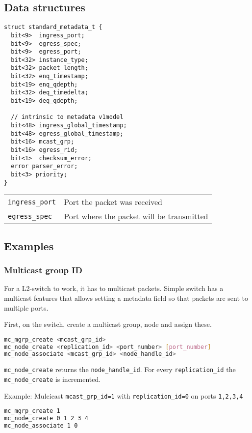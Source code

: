 \documentclass[a4paper, fontsize=8pt, landscape, DIV=1]{scrartcl}
\begin{document}
\begin{multicols*}{3}
  \subsection{Data structures}

  \begin{lstlisting}[style=P4style]
struct standard_metadata_t {
  bit<9>  ingress_port;
  bit<9>  egress_spec;
  bit<9>  egress_port;
  bit<32> instance_type;
  bit<32> packet_length;
  bit<32> enq_timestamp;
  bit<19> enq_qdepth;
  bit<32> deq_timedelta;
  bit<19> deq_qdepth;

  // intrinsic to metadata v1model
  bit<48> ingress_global_timestamp;
  bit<48> egress_global_timestamp;
  bit<16> mcast_grp;
  bit<16> egress_rid;
  bit<1>  checksum_error;
  error parser_error;
  bit<3> priority;
}\end{lstlisting}

\begin{tabularx}{\linewidth}{ l X }
  \lstinline[style=P4style]!ingress_port! &
  Port the packet was received \\
  \lstinline[style=P4style]!egress_spec! &
  Port where the packet will be transmitted \\
\end{tabularx}

  \subsection{Examples}

  \subsubsection{Multicast group ID}
  For a L2-switch to work, it has to multicast packets. Simple switch has a multicast features that
  allows setting a metadata field so that packets are sent to multiple ports.

  First, on the switch, create a multicast group, node and assign these.
  \begin{lstlisting}[language=bash]
mc_mgrp_create <mcast_grp_id>
mc_node_create <replication_id> <port_number> [port_number]
mc_node_associate <mcast_grp_id> <node_handle_id>\end{lstlisting}
  \texttt{mc\_node\_create} returns the \texttt{node\_handle\_id}. For every \texttt{replication\_id} the \texttt{mc\_node\_create} is incremented.

  Example: Mulcicast \texttt{mcast\_grp\_id=1} with \texttt{replication\_id=0} on ports \texttt{1,2,3,4} 
  \begin{lstlisting}[language=bash]
mc_mgrp_create 1
mc_node_create 0 1 2 3 4
mc_node_associate 1 0\end{lstlisting}


\end{multicols*}
\end{document}
